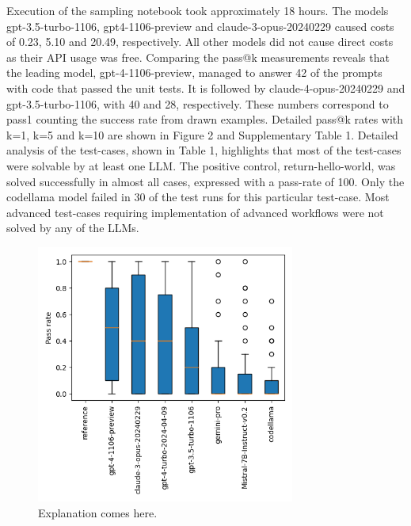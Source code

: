 \documentclass[doubleblind]{ecai}
\begin{document}
Execution of the sampling notebook took approximately 18 hours. The models gpt-3.5-turbo-1106, gpt4-1106-preview and claude-3-opus-20240229 caused costs of 0.23, 5.10 and 20.49, respectively. All other models did not cause direct costs as their API usage was free. Comparing the pass@k measurements reveals that the leading model, gpt-4-1106-preview, managed to answer 42 of the prompts with code that passed the unit tests. It is followed by claude-4-opus-20240229 and gpt-3.5-turbo-1106, with 40 and 28, respectively. These numbers correspond to pass1 counting the success rate from drawn examples. Detailed pass@k rates with k=1, k=5 and k=10 are shown in Figure 2 and Supplementary Table 1. 
Detailed analysis of the test-cases, shown in Table 1, highlights that most of the test-cases were solvable by at least one LLM. The positive control, return-hello-world, was solved successfully in almost all cases, expressed with a pass-rate of 100. Only the codellama model failed in 30 of the test runs for this particular test-case. Most advanced test-cases requiring implementation of advanced workflows were not solved by any of the LLMs.  

\begin{figure}[h]
\centering
\includegraphics[width=8.5cm]{pass_rate_llms.png}
\caption{Explanation comes here.}
\label{fig:passratellms}
\end{figure}
\end{document}
